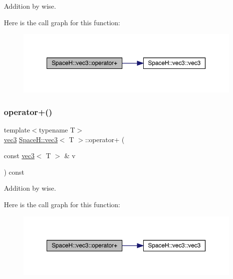 Addition by wise. 

Here is the call graph for this function\+:
\nopagebreak
\begin{figure}[H]
\begin{center}
\leavevmode
\includegraphics[width=348pt]{struct_space_h_1_1vec3_a439dd37afaf3c046cd58b370b9d70b80_cgraph}
\end{center}
\end{figure}
\mbox{\label{struct_space_h_1_1vec3_a439dd37afaf3c046cd58b370b9d70b80}} 
\subsubsection{\texorpdfstring{operator+()}{operator+()}\hspace{0.1cm}{\footnotesize\ttfamily [3/7]}}
{\footnotesize\ttfamily template$<$typename T$>$ \\
\mbox{\hyperlink{struct_space_h_1_1vec3}{vec3}} \mbox{\hyperlink{struct_space_h_1_1vec3}{Space\+H\+::vec3}}$<$ T $>$\+::operator+ (\begin{DoxyParamCaption}\item[{const \mbox{\hyperlink{struct_space_h_1_1vec3}{vec3}}$<$ T $>$ \&}]{v }\end{DoxyParamCaption}) const\hspace{0.3cm}{\ttfamily [inline]}}



Addition by wise. 

Here is the call graph for this function\+:
\nopagebreak
\begin{figure}[H]
\begin{center}
\leavevmode
\includegraphics[width=348pt]{struct_space_h_1_1vec3_a439dd37afaf3c046cd58b370b9d70b80_cgraph}
\end{center}
\end{figure}
\mbox{\label{struct_space_h_1_1vec3_a439dd37afaf3c046cd58b370b9d70b80}} 
